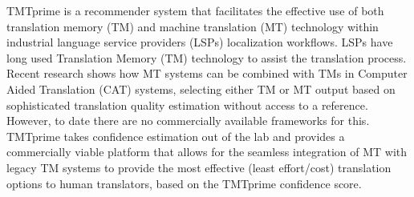 TMTprime is a recommender system that facilitates the effective use of both translation memory (TM) and machine translation (MT) technology within
 industrial language service providers (LSPs) localization workflows. LSPs have
 long used Translation Memory (TM) technology to assist the translation process.
 Recent research shows how MT systems can be combined with TMs in Computer Aided
 Translation (CAT) systems, selecting either TM or MT output based on
 sophisticated translation quality estimation without access to a reference.
 However, to date there are no commercially available frameworks for this.
 TMTprime takes confidence estimation out of the lab and provides a commercially
 viable platform that allows for the seamless integration of MT with legacy TM
 systems to provide the most effective (least effort/cost) translation options
 to human translators, based on the TMTprime confidence score.

